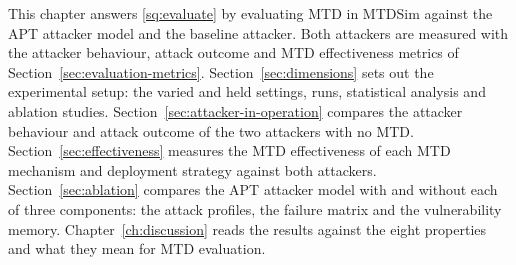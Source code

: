 \documentclass{cshonours}
\begin{document}
This chapter answers \ref{sq:evaluate} by evaluating MTD in MTDSim against
the APT attacker model and the baseline attacker. Both attackers are
measured with the attacker behaviour, attack outcome and MTD effectiveness
metrics of Section~\ref{sec:evaluation-metrics}.
Section~\ref{sec:dimensions} sets out the experimental setup: the varied and
held settings, runs, statistical analysis and ablation studies.
Section~\ref{sec:attacker-in-operation} compares the attacker behaviour and
attack outcome of the two attackers with no MTD.
Section~\ref{sec:effectiveness} measures the MTD effectiveness of each MTD
mechanism and deployment strategy against both attackers.
Section~\ref{sec:ablation} compares the APT attacker model with and without
each of three components: the attack profiles, the failure matrix and the
vulnerability memory. Chapter~\ref{ch:discussion} reads the results against
the eight properties and what they mean for MTD evaluation.
\end{document}
